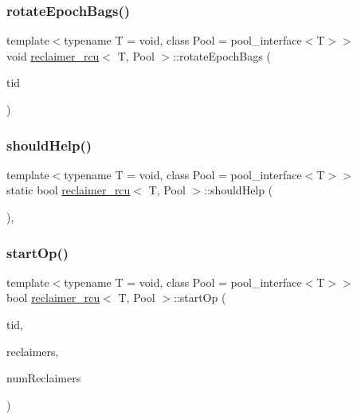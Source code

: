 \mbox{\label{classreclaimer__rcu_ae67cc73f8475079f0a2696459d304c95}} 
\subsubsection{\texorpdfstring{rotate\+Epoch\+Bags()}{rotateEpochBags()}}
{\footnotesize\ttfamily template$<$typename T  = void, class Pool  = pool\+\_\+interface$<$\+T$>$$>$ \\
void \hyperlink{classreclaimer__rcu}{reclaimer\+\_\+rcu}$<$ T, Pool $>$\+::rotate\+Epoch\+Bags (\begin{DoxyParamCaption}\item[{const int}]{tid }\end{DoxyParamCaption})\hspace{0.3cm}{\ttfamily [inline]}}

\mbox{\label{classreclaimer__rcu_a524af2f160524a0d662b1ffd29730d35}} 
\subsubsection{\texorpdfstring{should\+Help()}{shouldHelp()}}
{\footnotesize\ttfamily template$<$typename T  = void, class Pool  = pool\+\_\+interface$<$\+T$>$$>$ \\
static bool \hyperlink{classreclaimer__rcu}{reclaimer\+\_\+rcu}$<$ T, Pool $>$\+::should\+Help (\begin{DoxyParamCaption}{ }\end{DoxyParamCaption})\hspace{0.3cm}{\ttfamily [inline]}, {\ttfamily [static]}}

\mbox{\label{classreclaimer__rcu_a5d9e6b96518bace44b08d02fc69e6f42}} 
\subsubsection{\texorpdfstring{start\+Op()}{startOp()}}
{\footnotesize\ttfamily template$<$typename T  = void, class Pool  = pool\+\_\+interface$<$\+T$>$$>$ \\
bool \hyperlink{classreclaimer__rcu}{reclaimer\+\_\+rcu}$<$ T, Pool $>$\+::start\+Op (\begin{DoxyParamCaption}\item[{const int}]{tid,  }\item[{void $\ast$const $\ast$const}]{reclaimers,  }\item[{const int}]{num\+Reclaimers }\end{DoxyParamCaption})\hspace{0.3cm}{\ttfamily [inline]}}


